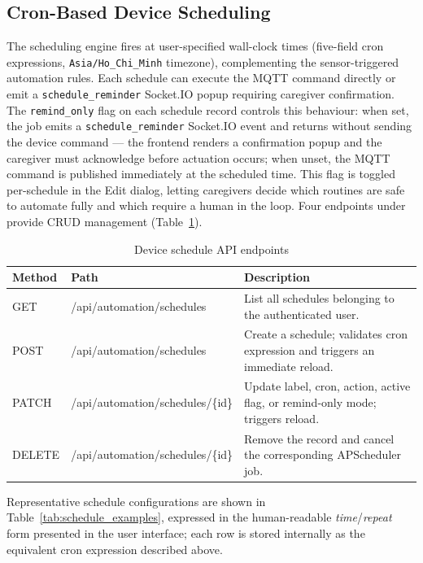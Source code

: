 \subsection{Cron-Based Device Scheduling}
\label{subsec:device_scheduling}

The scheduling engine fires at user-specified wall-clock times (five-field
cron expressions, \texttt{Asia/Ho\_Chi\_Minh} timezone), complementing the
sensor-triggered automation rules. Each schedule can execute the MQTT command
directly or emit a \texttt{schedule\_reminder} Socket.IO popup requiring caregiver
confirmation. The \texttt{remind\_only} flag on each schedule record controls this
behaviour: when set, the job emits a \texttt{schedule\_reminder} Socket.IO event
and returns without sending the device command --- the frontend renders a
confirmation popup and the caregiver must acknowledge before actuation occurs;
when unset, the MQTT command is published immediately at the scheduled time. This flag is toggled per-schedule
in the Edit dialog, letting caregivers decide which routines are safe to
automate fully and which require a human in the loop. Four endpoints under
 provide CRUD management
(Table~\ref{tab:schedule_api}).

\begin{table}[H]
\centering
\caption{Device schedule API endpoints}
\label{tab:schedule_api}
\small
\begin{tabularx}{\textwidth}{@{} l >{\ttfamily\RaggedRight\arraybackslash}p{6.1cm} >{\RaggedRight\arraybackslash}X @{}}
\toprule
\textbf{Method} & \textbf{Path} & \textbf{Description} \\
\midrule
GET    & /api/automation/schedules         & List all schedules belonging to the authenticated user. \\
POST   & /api/automation/schedules         & Create a schedule; validates cron expression and triggers an immediate reload. \\
PATCH  & /api/automation/schedules/\{id\}  & Update label, cron, action, active flag, or remind-only mode; triggers reload. \\
DELETE & /api/automation/schedules/\{id\}  & Remove the record and cancel the corresponding APScheduler job. \\
\bottomrule
\end{tabularx}
\end{table}

Representative schedule configurations are shown in
Table~\ref{tab:schedule_examples}, expressed in the human-readable
\textit{time}/\textit{repeat} form presented in the user interface; each row is
stored internally as the equivalent cron expression described above.


